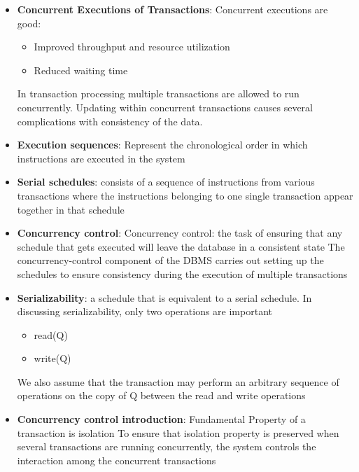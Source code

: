 \documentclass{report}
\begin{document}
\begin{itemize}
\begin{itemize}
             \end{itemize}
        \item \textbf{Concurrent Executions of Transactions}: Concurrent executions are good:
            \begin{itemize}
                \item Improved throughput and resource utilization
                \item Reduced waiting time
            \end{itemize}
             In transaction processing multiple transactions are allowed to run concurrently.
             \bigbreak \noindent 
             Updating within concurrent transactions causes several complications with consistency of the data.
        \item \textbf{Execution sequences}: Represent the chronological order in which instructions are executed in the system
        \item \textbf{Serial schedules}: consists of a sequence of instructions from various transactions where the instructions belonging to one single transaction appear together in that schedule
        \item \textbf{Concurrency control}: Concurrency control: the task of ensuring that any schedule that gets executed will leave the database in a consistent state
            \bigbreak \noindent 
            The concurrency-control component of the DBMS carries out setting up the schedules to ensure consistency during the execution of multiple transactions
        \item \textbf{Serializability}: a schedule that is equivalent to a serial schedule.
            \bigbreak \noindent 
            In discussing serializability, only two operations are important
            \begin{itemize}
                \item read(Q)
                \item write(Q)
            \end{itemize}
             We also assume that the transaction may perform an arbitrary sequence of operations on the copy of Q between the read and write operations
        \item \textbf{Concurrency control introduction}: Fundamental Property of a transaction is isolation
            \bigbreak \noindent 
            To ensure that isolation property is preserved when several transactions are running concurrently, the system controls the interaction among the concurrent transactions

\end{itemize}
\end{document}

